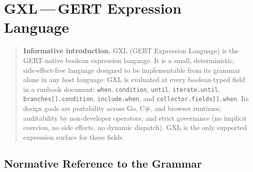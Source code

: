%
%

\providecommand{\TODO}[1]{\textbf{\textcolor{red}{[TODO:~#1]}}}

\chapter{GXL\,---\,GERT Expression Language}
\label{sec:gxl}

\begin{quote}
\noindent\textbf{Informative introduction.}
GXL (GERT Expression Language) is the GERT-native boolean expression language.
It is a small, deterministic, side-effect-free language designed to be
implementable from its grammar alone in any host language.
GXL is evaluated at every boolean-typed field in a runbook document:
\texttt{when}, \texttt{condition}, \texttt{until}, \texttt{iterate.until},
\texttt{branches[].condition}, \texttt{include.when}, and
\texttt{collector.fields[].when}.
Its design goals are portability across Go, C\#, and browser runtimes;
auditability by non-developer operators; and strict governance
(no implicit coercion, no side effects, no dynamic dispatch).
GXL is the only supported expression surface for these fields.
\end{quote}

\section{Normative Reference to the Grammar}
\label{sec:gxl:normref}

